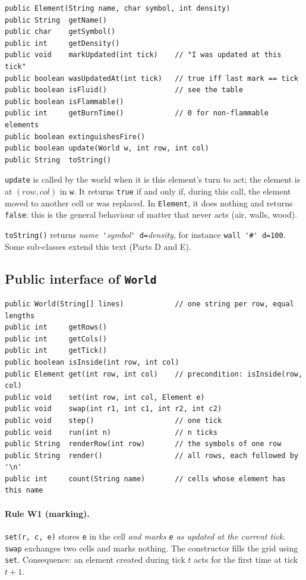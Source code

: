 \documentclass[11pt,a4paper]{article}
\newcommand{\code}[1]{\texttt{#1}}
\begin{document}
\begin{lstlisting}
public Element(String name, char symbol, int density)
public String  getName()
public char    getSymbol()
public int     getDensity()
public void    markUpdated(int tick)    // "I was updated at this tick"
public boolean wasUpdatedAt(int tick)   // true iff last mark == tick
public boolean isFluid()                // see the table
public boolean isFlammable()
public int     getBurnTime()            // 0 for non-flammable elements
public boolean extinguishesFire()
public boolean update(World w, int row, int col)
public String  toString()
\end{lstlisting}

\code{update} is called by the world when it is this element's turn to act; the element is at
\((\mathit{row},\mathit{col})\) in \code{w}. It returns \code{true} if and only if, during this call,
the element moved to another cell or was replaced. In \code{Element}, it does nothing and returns
\code{false}: this is the general behaviour of matter that never acts (air, walls, wood).

\code{toString()} returns \textit{name}\verb*| '|\textit{symbol}\verb*|' d=|\textit{density},
for instance \verb|wall '#' d=100|. Some sub-classes extend this text (Parts D and E).

\subsection{Public interface of \texttt{World}}

\begin{lstlisting}
public World(String[] lines)            // one string per row, equal lengths
public int     getRows()
public int     getCols()
public int     getTick()
public boolean isInside(int row, int col)
public Element get(int row, int col)    // precondition: isInside(row, col)
public void    set(int row, int col, Element e)
public void    swap(int r1, int c1, int r2, int c2)
public void    step()                   // one tick
public void    run(int n)               // n ticks
public String  renderRow(int row)       // the symbols of one row
public String  render()                 // all rows, each followed by '\n'
public int     count(String name)       // cells whose element has this name
\end{lstlisting}

\paragraph{Rule W1 (marking).} \code{set(r, c, e)} stores \code{e} in the cell \emph{and marks
\code{e} as updated at the current tick}. \code{swap} exchanges two cells and marks nothing. The
constructor fills the grid using \code{set}. Consequence: an element created during tick \(t\)
acts for the first time at tick \(t+1\).
\end{document}
